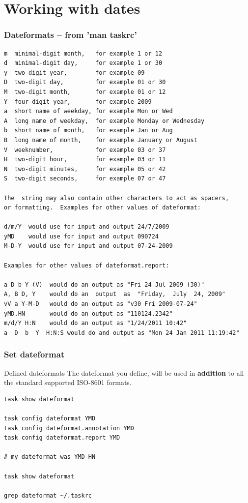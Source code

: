 \documentclass[t,handout]{beamer}
\begin{document}
\section{Working with dates}

\begin{frame}[fragile]\frametitle{Dateformats -- from 'man taskrc'}
    \begin{lstlisting}
m  minimal-digit month,   for example 1 or 12
d  minimal-digit day,     for example 1 or 30
y  two-digit year,        for example 09
D  two-digit day,         for example 01 or 30
M  two-digit month,       for example 01 or 12
Y  four-digit year,       for example 2009
a  short name of weekday, for example Mon or Wed
A  long name of weekday,  for example Monday or Wednesday
b  short name of month,   for example Jan or Aug
B  long name of month,    for example January or August
V  weeknumber,            for example 03 or 37
H  two-digit hour,        for example 03 or 11
N  two-digit minutes,     for example 05 or 42
S  two-digit seconds,     for example 07 or 47

The  string may also contain other characters to act as spacers,
or formatting.  Examples for other values of dateformat:

d/m/Y  would use for input and output 24/7/2009
yMD    would use for input and output 090724
M-D-Y  would use for input and output 07-24-2009

Examples for other values of dateformat.report:

a D b Y (V)  would do an output as "Fri 24 Jul 2009 (30)"
A, B D, Y    would do an  output  as  "Friday,  July  24, 2009"
vV a Y-M-D   would do an output as "v30 Fri 2009-07-24"
yMD.HN       would do an output as "110124.2342"
m/d/Y H:N    would do an output as "1/24/2011 10:42"
a  D  b  Y  H:N:S would do and output as "Mon 24 Jan 2011 11:19:42"\end{lstlisting}
\end{frame}

\begin{frame}[fragile]\frametitle{Set dateformat}
    \begin{alertblock}{Defined dateformats}
        The dateformat you define, will be used in \textbf{addition} to all the standard supported ISO-8601 formats.        
    \end{alertblock}

    \vfill
    \begin{lstlisting}
task show dateformat

task config dateformat YMD
task config dateformat.annotation YMD
task config dateformat.report YMD

# my dateformat was YMD-HN

task show dateformat

grep dateformat ~/.taskrc\end{lstlisting}
\end{frame}
\end{document}
